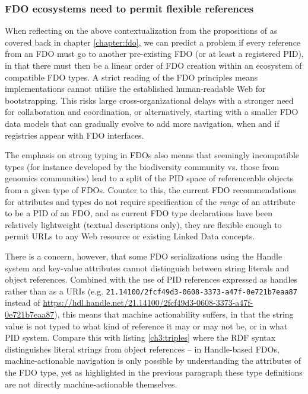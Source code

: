 
\subsubsection{FDO ecosystems need to permit flexible references}
\label{ch61:references}

When reflecting on the above contextualization from the propositions of
as covered back in chapter \ref{chapter:fdo}, we can predict a problem if every reference from an FDO must go to another pre-existing FDO (or at least a registered \acrshort{PID}), in that there must then be a linear order of FDO creation within an ecosystem of compatible FDO types.
A strict reading of the FDO principles means implementations cannot utilise the established human-readable Web for bootstrapping.
This risks large cross-organizational delays with a stronger need for collaboration and coordination, or alternatively, starting with a smaller FDO data models that can gradually evolve to add more navigation, when and if registries appear with FDO interfaces. 

The emphasis on strong typing in FDOs also means that seemingly incompatible types (for instance developed by the biodiversity community vs. those from genomics communities) lead to a split of the PID space of referenceable objects from a given type of FDOs.  Counter to this, the current FDO recommendations for attributes and types \cite{Blanchi 2023} do not require specification of the \emph{range} of an attribute to be a PID of an FDO, and as current FDO type declarations have been relatively lightweight (textual descriptions only), they are flexible enough to permit URLs to any Web resource or existing Linked Data concepts.  

There is a concern, however, that some FDO serializations using the \gls{Handle} system and key-value attributes cannot distinguish between string literals and object references.
Combined with the use of PID references expressed as handles rather than as a URIs (e.g. \texttt{21.14100/2fcf49d3-0608-3373-a47f-0e721b7eaa87} instead of \url{https://hdl.handle.net/21.14100/2fcf49d3-0608-3373-a47f-0e721b7eaa87}), this means that machine actionability suffers, in that the string value is not typed to what kind of reference it may or may not be, or in what PID system. Compare this with listing \vref{ch3:triples} where the RDF syntax distinguishes literal strings from object references -- in Handle-based FDOs, machine-actionable navigation is only possible by understanding the attributes of the FDO type, yet as highlighted in the previous paragraph these type definitions are not directly machine-actionable themselves.

